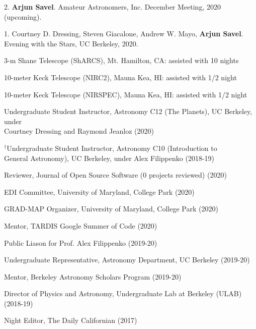 \documentclass[12pt,letterpaper]{article}
\begin{document}
\begin{list}{}{\cvlist}
\item 2. \textbf{Arjun Savel}. Amateur Astronomers, Inc. December Meeting, 2020 (upcoming).
\item 1. Courtney D. Dressing, Steven Giacalone, Andrew W. Mayo, \textbf{Arjun Savel}. Evening with the Stars, UC Berkeley, 2020.
\end{list}



\begin{list}{}{\cvlist}

\item 3-m Shane Telescope (ShARCS), Mt. Hamilton, CA: assisted with 10 nights
\item 10-meter Keck Telescope (NIRC2), Mauna Kea, HI: assisted with 1/2 night
\item 10-meter Keck Telescope (NIRSPEC), Mauna Kea, HI: assisted with 1/2 night

\end{list}


\begin{list}{}{\cvlist}
\item Undergraduate Student Instructor, Astronomy C12 (The Planets), UC Berkeley, under \\ Courtney Dressing and Raymond Jeanloz (2020)
\item $^\dagger$Undergraduate Student Instructor, Astronomy C10 (Introduction to \\ General Astronomy), UC Berkeley, under Alex Filippenko (2018-19)
\end{list}

\begin{list}{}{\cvlist}
\item Reviewer, Journal of Open Source Software (0 projects reviewed) (2020)
\item EDI Committee, University of Maryland, College Park (2020)
\item GRAD-MAP Organizer, University of Maryland, College Park (2020)
\item Mentor, TARDIS Google Summer of Code (2020)
\item Public Liason for Prof. Alex Filippenko (2019-20)
\item Undergraduate Representative, Astronomy Department, UC Berkeley (2019-20)
\item Mentor, Berkeley Astronomy Scholars Program (2019-20)
\item Director of Physics and Astronomy, Undergraduate Lab at Berkeley (ULAB) (2018-19)
\item Night Editor, The Daily Californian (2017)
\end{list}
\end{document}
